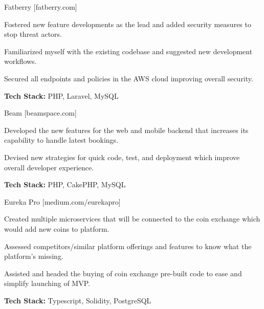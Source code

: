\begin{cventries}
{\begin{cvitems}
                \item
                    {Fatberry [fatberry.com]}
                \begin{cvsubitems}
                    \item
                        {Fostered new feature developments as the lead and added security measures to stop threat actors.}
                    \item 
                        {Familiarized myself with the existing codebase and suggested new development workflows.}
                    \item
                        {Secured all endpoints and policies in the AWS cloud improving overall security.}
                    \item 
                        {\textbf{Tech Stack:} PHP, Laravel, MySQL}
                \end{cvsubitems}
                \item
                    {Beam [beamspace.com]}
                \begin{cvsubitems}
                    \item
                        {Developed the new features for the web and mobile backend that increases its capability to handle latest bookings.}
                    \item
                        {Devised new strategies for quick code, test, and deployment which improve overall developer experience.}
                    \item 
                        {\textbf{Tech Stack:} PHP, CakePHP, MySQL}
                \end{cvsubitems}
                \item
                    {Eureka Pro [medium.com/eurekapro]}
                \begin{cvsubitems}
                    \item 
                        {Created multiple microservices that will be connected to the coin exchange which would add new coins to platform.}
                    \item
                        {Assessed competitors/similar platform offerings and features to know what the platform's missing.}
                    \item
                        {Assisted and headed the buying of coin exchange pre-built code to ease and simplify launching of MVP.}
                    \item 
                        {\textbf{Tech Stack:} Typescript, Solidity, PostgreSQL}
                \end{cvsubitems}
            \end{cvitems}
        }


\end{cventries}
